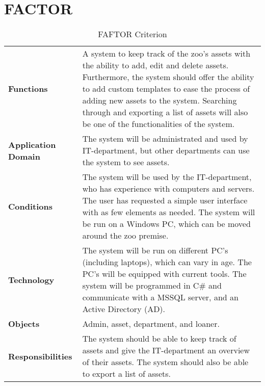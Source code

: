 \section{FACTOR}\label{sec:factor}
\par
\begin{table}[h!]
    \centering
    {
    \renewcommand{\arraystretch}{2.0}
    \begin{tabular}{ m{4cm} m{10cm} }
        \hline
        
        \textbf{Functions} & A system to keep track of the zoo's assets with the ability to add, edit and delete assets. Furthermore, the system should offer the ability to add custom templates to ease the process of adding new assets to the system. Searching through and exporting a list of assets will also be one of the functionalities of the system.\\
        \textbf{Application Domain} & The system will be administrated and used by IT-department, but other departments can use the system to see assets.\\
        \textbf{Conditions} & The system will be used by the IT-department, who has experience with computers and servers. The user has requested a simple user interface with as few elements as needed. The system will be run on a Windows PC, which can be moved around the zoo premise.\\
        \textbf{Technology} & The system will be run on different PC's (including laptops), which can vary in age. The PC's will be equipped with current tools. The system will be programmed in C\# and communicate with a MSSQL server, and an Active Directory (AD).\\
        \textbf{Objects} & Admin, asset, department, and loaner.\\
        \textbf{Responsibilities} & The system should be able to keep track of assets and give the IT-department an overview of their assets. The system should also be able to export a list of assets.\\
        
        \hline
    \end{tabular}
    \caption{FAFTOR Criterion}
    \label{tab:my_label}
    }
\end{table}